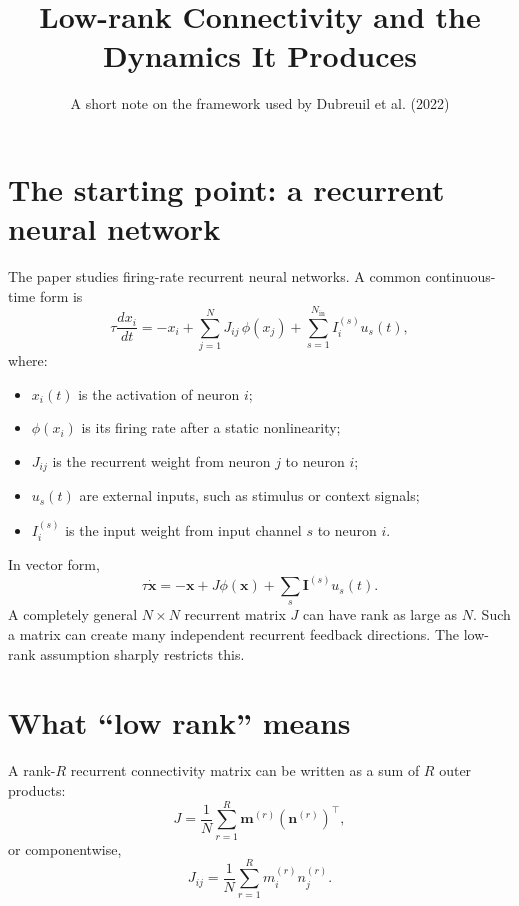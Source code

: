 \documentclass[11pt]{article}
\title{\vspace{-1.2cm}Low-rank Connectivity and the Dynamics It Produces}
\author{A short note on the framework used by Dubreuil et al. (2022)}
\date{}
\newcommand{\vx}{\mathbf{x}}
\newcommand{\vm}{\mathbf{m}}
\newcommand{\vn}{\mathbf{n}}
\newcommand{\vI}{\mathbf{I}}
\begin{document}
\maketitle
\vspace{-0.8cm}

\section{The starting point: a recurrent neural network}

The paper studies firing-rate recurrent neural networks. A common continuous-time
form is
\begin{equation}
  \tau \frac{d x_i}{dt}
  =
  -x_i
  +
  \sum_{j=1}^{N} J_{ij}\,\phi(x_j)
  +
  \sum_{s=1}^{N_{\mathrm{in}}} I_i^{(s)} u_s(t),
  \label{eq:rnn_component}
\end{equation}
where:
\begin{itemize}
  \item $x_i(t)$ is the activation of neuron $i$;
  \item $\phi(x_i)$ is its firing rate after a static nonlinearity;
  \item $J_{ij}$ is the recurrent weight from neuron $j$ to neuron $i$;
  \item $u_s(t)$ are external inputs, such as stimulus or context signals;
  \item $I_i^{(s)}$ is the input weight from input channel $s$ to neuron $i$.
\end{itemize}

In vector form,
\begin{equation}
  \tau \dot{\vx}
  =
  -\vx + J\phi(\vx) + \sum_s \vI^{(s)}u_s(t).
\end{equation}
A completely general $N \times N$ recurrent matrix $J$ can have rank as large as
$N$. Such a matrix can create many independent recurrent feedback directions.
The low-rank assumption sharply restricts this.

\section{What ``low rank'' means}

A rank-$R$ recurrent connectivity matrix can be written as a sum of $R$ outer
products:
\begin{equation}
  J
  =
  \frac{1}{N}
  \sum_{r=1}^{R} \vm^{(r)} \left(\vn^{(r)}\right)^{\top},
  \label{eq:lowrank_matrix}
\end{equation}
or componentwise,
\begin{equation}
  J_{ij}
  =
  \frac{1}{N}
  \sum_{r=1}^{R} m_i^{(r)} n_j^{(r)}.
\end{equation}
\end{document}
